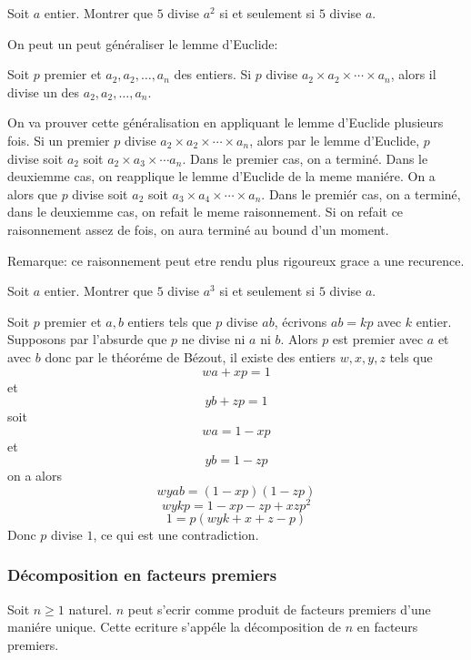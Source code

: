 \exo
Soit \(a\) entier.
Montrer que \(5\) divise \(a^2\) si et seulement si \(5\) divise \(a\).

On peut un peut généraliser le lemme d'Euclide:


Soit \(p\) premier et \(a_2 , a_2 , \ldots , a_{n}\) des entiers. Si \(p\) divise \(a_2 \times a_2 \times \cdots \times a_{n}\), alors il divise un des \(a_2 , a_2 , \ldots , a_{n}\).

\endgroup

\preuve

On va prouver cette généralisation en appliquant le lemme d'Euclide plusieurs fois.
Si un premier \(p\) divise \(a_2 \times a_2 \times \cdots \times a_{n}\), alors par le lemme d'Euclide, \(p\) divise soit \(a_2\) soit \(a_2 \times a_{3} \times \cdots a_{n}\). Dans le premier cas, on a terminé. Dans le deuxiemme cas, on reapplique le lemme d'Euclide de la meme maniére. On a alors que \(p\) divise soit \(a_2\) soit \(a_{3} \times a_{4} \times \cdots \times a_{n}\). Dans le premiér cas, on a terminé, dans le deuxiemme cas, on refait le meme raisonnement. Si on refait ce raisonnement assez de fois, on aura terminé au bound d'un moment.

Remarque: ce raisonnement peut etre rendu plus rigoureux grace a une recurence.

\exo
Soit \(a\) entier.
Montrer que \(5\) divise \(a^{3}\) si et seulement si \(5\) divise \(a\).


Soit \(p\) premier et \(a, b\) entiers tels que \(p\) divise \(ab\), écrivons \(ab = kp\) avec \(k\) entier. Supposons par l'absurde que \(p\) ne divise ni \(a\) ni \(b\). Alors \(p\) est premier avec \(a\) et avec \(b\) donc par le théoréme de Bézout, il existe des entiers \(w, x, y, z\) tels que
\[wa + xp = 1\]
et
\[yb + zp = 1\]
soit
\[wa = 1 - xp\]
et
\[yb = 1 - zp\]
on a alors
\[wyab = \left(1 - xp\right)\left(1 - zp\right)\]
\[wykp = 1 - xp - zp + xzp^2\]
\[1 = p\left(wyk + x + z - p\right)\]
Donc \(p\) divise \(1\), ce qui est une contradiction.

\subsubsection{Décomposition en facteurs premiers}
Soit \(n\geqslant1\) naturel. \(n\) peut s'ecrir comme produit de facteurs premiers d'une maniére unique. Cette ecriture s'appéle la décomposition de \(n\) en facteurs premiers.

